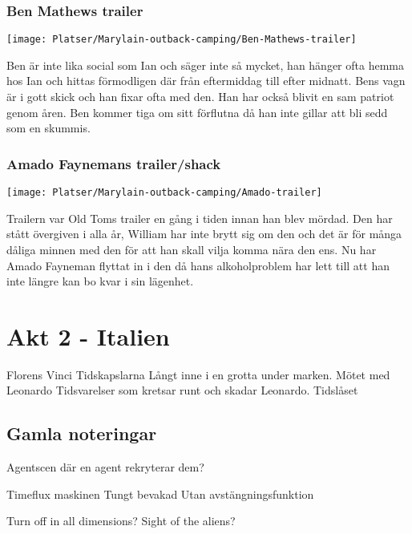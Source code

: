 \documentclass[a5paper,10pt]{report}
\begin{document}
\subsection{Ben Mathews trailer}
\texttt{[image: Platser/Marylain-outback-camping/Ben-Mathews-trailer]}

Ben är inte lika social som Ian och säger inte så mycket, han hänger ofta hemma hos Ian och hittas förmodligen där från eftermiddag till efter midnatt. Bens vagn är i gott skick och han fixar ofta med den. Han har också blivit en sam patriot genom åren. Ben kommer tiga om sitt förflutna då han inte gillar att bli sedd som en skummis.
\clearpage
\subsection{Amado Faynemans trailer/shack}
\texttt{[image: Platser/Marylain-outback-camping/Amado-trailer]}

Trailern var Old Toms trailer en gång i tiden innan han blev mördad. Den har stått övergiven i alla år, William har inte brytt sig om den och det är för många dåliga minnen med den för att han skall vilja komma nära den ens. Nu har Amado Fayneman flyttat in i den då hans alkoholproblem har lett till att han inte längre kan bo kvar i sin lägenhet.
\chapter{Akt 2 - Italien}
Florens
Vinci
Tidskapslarna
Långt inne i en grotta under marken.
Mötet med Leonardo
Tidsvarelser som kretsar runt och skadar Leonardo.
Tidslåset
\clearpage
\section{Gamla noteringar}

Agentscen där en agent rekryterar dem?

Timeflux maskinen
  Tungt bevakad
  Utan avstängningsfunktion

Turn off in all dimensions?
  Sight of the aliens?
\end{document}
